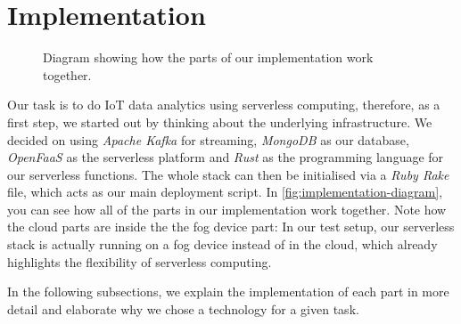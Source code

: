 \chapter{Implementation}
\label{sec:implementation}

\begin{figure}[H]
  \caption{Diagram showing how the parts of our implementation work together.
    \cite{smartphone-icon, browser-icon}
  }
  \label{fig:implementation-diagram}
\end{figure}

Our task is to do IoT data analytics using serverless computing, therefore, as a first step, we
started out by thinking about the underlying infrastructure. We decided on using \textit{Apache
Kafka} for streaming, \textit{MongoDB} as our database, \textit{OpenFaaS} as the serverless platform
and \textit{Rust} as the programming language for our serverless functions. The whole stack can then
be initialised via a \textit{Ruby Rake} file, which acts as our main deployment script. In
\autoref{fig:implementation-diagram}, you can see how all of the parts in our implementation work
together. Note how the cloud parts are inside the the fog device part: In our test setup, our
serverless stack is actually running on a fog device instead of in the cloud, which already
highlights the flexibility of serverless computing.

In the following subsections, we explain the implementation of each part in more detail and
elaborate why we chose a technology for a given task.










